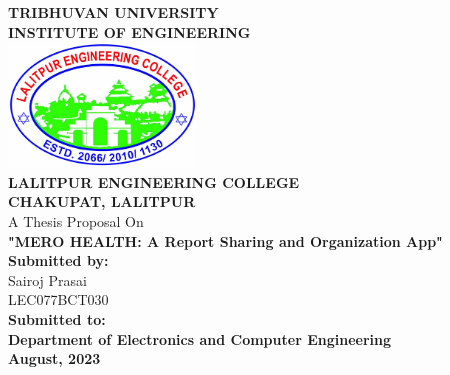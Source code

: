 
%
\begin{titlepage}
  \addtolength{\hoffset}{0.5\evensidemargin-0.5\oddsidemargin} %
  \noindent%
  
  \begin{center}
  
\textsc{\LARGE \bfseries TRIBHUVAN UNIVERSITY}\\[0.5cm] %
\textsc{\large \bfseries INSTITUTE OF ENGINEERING}\\[1cm]
\includegraphics[width=50mm]{figures/LECLogo.jpg}\\[1cm]

\textsc{\large \bfseries LALITPUR ENGINEERING COLLEGE}\\[0.5cm]
\textsc{\large \bfseries CHAKUPAT, LALITPUR}\\[0.5cm]
A Thesis Proposal On \\[0.2cm]
\Large \textbf{"\MakeUppercase{Mero Health}: A Report Sharing and Organization App"}\\[0.5cm]
\vspace{2.2cm}
\textbf{Submitted by:}\\
\large{ Sairoj Prasai   \\
 LEC077BCT030 }\\
\vspace{2.2cm}
\textbf{Submitted to:}\\
\textbf{Department of Electronics and Computer Engineering}
\\[0.4cm]
\vspace{0.5cm}
        \textbf{August, 2023}\\
\end{center}
\end{titlepage}
\clearpage